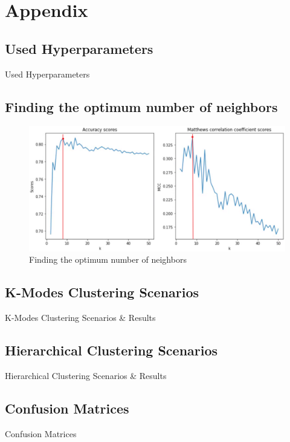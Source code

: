 \section{Appendix}

\subsection{Used Hyperparameters}
\label{ssec:ushp}
\begin{table}[h]
\begin{footnotesize}

\end{footnotesize}
\caption{\label{tab:Hyperparameters} Used Hyperparameters}
\end{table}

\subsection{Finding the optimum number of neighbors}
\label{ssec:fonn}
\begin{figure}[h]
    \centering
    \includegraphics[width=.7\linewidth]{ThesisTemplate/Images/KNN_n_neighbors.png}
    \caption{Finding the optimum number of neighbors}
\end{figure}

\subsection{K-Modes Clustering Scenarios}
\label{ssec:cluscen}
\begin{table}[H]
\begin{footnotesize}

\end{footnotesize}
\caption{\label{tab:clusc} K-Modes Clustering Scenarios \& Results}
\end{table}

\subsection{Hierarchical Clustering Scenarios}
\label{ssec:hieclu}
\begin{table}[H]
\begin{footnotesize}

\end{footnotesize}
\caption{\label{tab:hieclu} Hierarchical Clustering Scenarios \& Results}
\end{table}


\subsection{Confusion Matrices}
\label{ssec:cm}
\begin{table}[H]
\begin{footnotesize}

\end{footnotesize}
\caption{\label{tab:cm} Confusion Matrices}
\end{table}